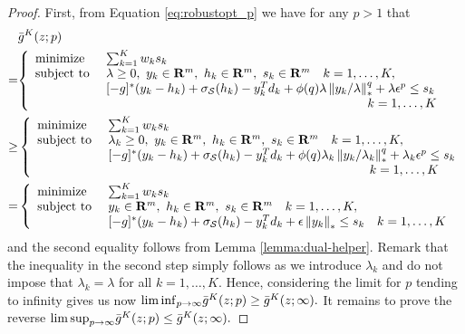 \begin{proof}
  First, from Equation \eqref{eq:robustopt_p} we have for any $p> 1$ that
  \begin{align*}
    & \bar g^K(z;p)\\
    =&\reviewChanges{
                       \left\{
                       \begin{array}{l@{~~~~}l}
												\mbox{minimize} & \sum_{k=1}^K w_k s_k\\
                         \mbox{subject to} &  \lambda \geq 0,~ y_{k}\in \Re^m, ~h_{k}\in \Re^m, ~s_k\in \Re^m \quad k = 1,\dots,K,\\
                              &  [-g]^*(y_{k} - h_{k}) + \sigma_{\supp}(h_{k}) - y_{k}^T{d}_k  + \phi(q)\lambda \left\|y_{k}/\lambda \right\|^q_* + \lambda \epsilon^p\le s_k\\
															&\hspace{7cm} \quad k=1,\dots, K
                       \end{array}
                       \right.}\\
    \geq &
                       \left\{
                       \begin{array}{l@{~~~~}l}
												\mbox{minimize} & \sum_{k=1}^K w_k s_k\\
                         \mbox{subject to} &  \lambda_k \geq 0,~ y_{k}\in \Re^m, ~h_{k}\in \Re^m, ~s_k\in \Re^m \quad k = 1,\dots,K,\\
                              &  [-g]^*(y_{k} - h_{k}) + \sigma_{\supp}(h_{k}) - y_{k}^T{d}_k  + \phi(q)\lambda_k \left\|y_{k}/\lambda_k \right\|^q_* + \lambda_k \epsilon^p\le s_k\\
															&\hspace{7cm} \quad k=1,\dots, K
                       \end{array}
                       \right.\\
    = &
           \left\{
           \begin{array}{l@{~~~~}l}
						\mbox{minimize} & \sum_{k=1}^K w_k s_k\\
             \mbox{subject to} & y_{k}\in \Re^m, ~h_{k}\in \Re^m, ~s_k\in \Re^m \quad k = 1,\dots, K,\\
                  &  [-g]^*(y_{k} - h_{k}) + \sigma_{\supp}(h_{k}) - y_{k}^T{d}_k + \epsilon \left\|y_{k} \right\|_*\le s_k \quad k =1,\dots, K
           \end{array}
           \right.
  \end{align*}
   and the second equality follows from Lemma \ref{lemma:dual-helper}. Remark that the inequality in the second step simply follows as we introduce $\lambda_k$ and do not impose that $\lambda_k=\lambda$ for all $k=1,\dots, K$.
  Hence, considering the limit for $p$ tending to infinity gives us now
  \(
  {\liminf_{p\to \infty}} \bar g^K(z;p)\geq \bar g^K(z;\infty).
  \)
  It remains to prove the reverse
  \(
  {\limsup_{p\to \infty}} \bar g^K(z;p) \leq \bar g^K(z;\infty).
  \)


\end{proof}
